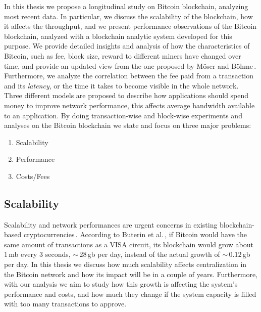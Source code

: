 \documentclass[USenglish]{uit-thesis}
\begin{document}
In this thesis we propose a longitudinal study on Bitcoin blockchain,
analyzing most recent data.
In particular, we discuss the scalability of the blockchain, how it affects
the throughput, and we present performance observations of the
Bitcoin blockchain, analyzed with a blockchain analytic system developed
for this purpose. We provide detailed insights and analysis of how
the characteristics of Bitcoin, such as fee,
block size, reward to different
miners have changed over time, and provide an
updated view from the one proposed
by Möser and Böhme\,\cite{Moser2015}.
Furthermore, we analyze the
correlation between the fee paid from a transaction
and its \emph{latency}, or the time it takes to 
become visible in the whole network.
Three different models are proposed to describe how applications
should spend money to improve network performance,
this affects average bandwidth available to an application.
By doing transaction-wise and block-wise experiments
and analyses on the Bitcoin blockchain
we state and focus on three major problems:
\begin{enumerate}[noitemsep]
	\item Scalability
	\item Performance
	\item Costs/Fees
\end{enumerate}

\subsection{Scalability}
\label{sec:prob_stat_scalability}
Scalability and network performances are urgent
concerns in existing blockchain-based
cryptocurrencies\,\cite{croman2016}.
According to Buterin et al.\,\cite{ethereum_white_paper},
if Bitcoin would have the same amount of transactions
as a VISA circuit, its blockchain would grow
about $1$\,\gls{mb} every $3$ seconds, $\sim$\,$28$\,\gls{gb} per day,
instead of the actual growth of $\sim$\,$0.12$\,\gls{gb} per day.
In this thesis we discuss how much scalability affects
centralization in the Bitcoin network
and how its impact will be in a couple of years.
Furthermore, with our analysis we aim to study
how this growth is affecting the system's
performance and costs, and how much they
change if the system capacity is filled with
too many transactions to approve.
\end{document}
